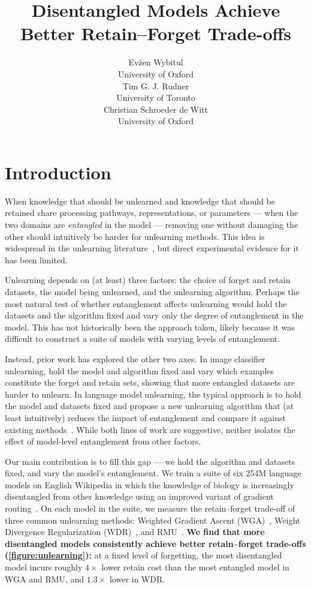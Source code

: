 \documentclass{article} %
\title{Disentangled Models Achieve Better Retain--Forget Trade-offs}
\author{Evžen Wybitul \\
  University of Oxford \\
  \And
  Tim G. J. Rudner \\
  University of Toronto \\
  \And
  Christian Schroeder de Witt \\
  University of Oxford
}
\begin{document}
\maketitle


\section{Introduction}

When knowledge that should be unlearned and knowledge that should be retained share processing pathways, representations, or parameters --- when the two domains are \emph{entangled} in the model --- removing one without damaging the other should intuitively be harder for unlearning methods.
This idea is widespread in the unlearning literature~\citep{barez2025openproblemsmachineunlearning}, but direct experimental evidence for it has been limited.

Unlearning depends on (at least) three factors: the choice of forget and retain datasets, the model being unlearned, and the unlearning algorithm.
Perhaps the most natural test of whether entanglement affects unlearning would hold the datasets and the algorithm fixed and vary only the degree of entanglement in the model.
This has not historically been the approach taken, likely because it was difficult to construct a suite of models with varying levels of entanglement.

Instead, prior work has explored the other two axes.
In image classifier unlearning, \citet{zhao2024what} hold the model and algorithm fixed and vary which examples constitute the forget and retain sets, showing that more entangled datasets are harder to unlearn.
In language model unlearning, the typical approach is to hold the model and datasets fixed and propose a new unlearning algorithm that (at least intuitively) reduces the impact of entanglement and compare it against existing methods~\citep{sondej2025collapseirrelevantrepresentationscir, tang2026logitslatentscontrastiverepresentation, chen2026clue}.
While both lines of work are suggestive, neither isolates the effect of model-level entanglement from other factors.

Our main contribution is to fill this gap --- we hold the algorithm and datasets fixed, and vary the model's entanglement.
We train a suite of six 254M language models on English Wikipedia in which the knowledge of biology is increasingly disentangled from other knowledge using an improved variant of gradient routing~\citep{shilov2025datafilteringknowledgelocalization, cloud2024gradientroutingmaskinggradients}.
On each model in the suite, we measure the retain--forget trade-off of three common unlearning methods: Weighted Gradient Ascent (WGA)~\citep{wang2025rethinking}, Weight Divergence Regularization (WDR)~\citep{siddiqui2025dormant}, and RMU~\citep{li2024wmdp}.
\textbf{We find that more disentangled models consistently achieve better retain--forget trade-offs (\cref{figure:unlearning}):} at a fixed level of forgetting, the most disentangled model incurs roughly $4\times$ lower retain cost than the most entangled model in WGA and RMU, and $1.3\times$ lower in WDR.
\end{document}
